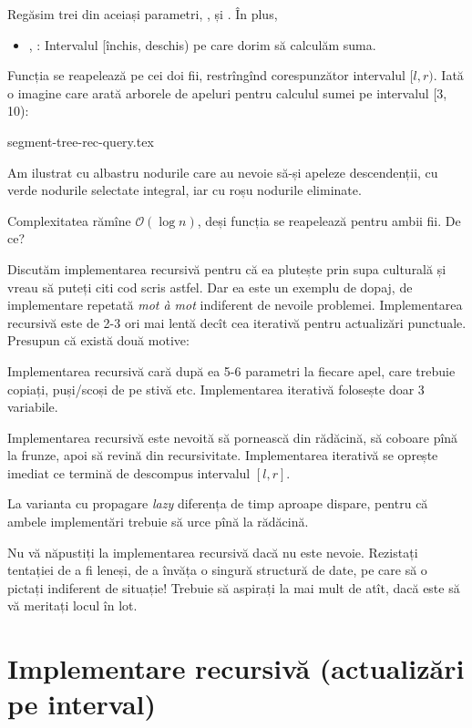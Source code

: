 Regăsim trei din aceiași parametri, ,  și . În plus,

\begin{itemize}
  \item {}, : Intervalul [închis, deschis) pe care dorim să calculăm suma.
\end{itemize}

Funcția se reapelează pe cei doi fii, restrîngînd corespunzător intervalul $[l, r)$. Iată o imagine care arată arborele de apeluri pentru calculul sumei pe intervalul [3, 10):

{segment-tree-rec-query.tex}

Am ilustrat cu albastru nodurile care au nevoie să-și apeleze descendenții, cu verde nodurile selectate integral, iar cu roșu nodurile eliminate.

Complexitatea rămîne $\mathcal{O}(\log n)$, deși funcția se reapelează pentru ambii fii. De ce?

Discutăm implementarea recursivă pentru că ea plutește prin supa culturală și vreau să puteți citi cod scris astfel. Dar ea este un exemplu de dopaj, de implementare repetată \textit{mot à mot} indiferent de nevoile problemei. Implementarea recursivă este de 2-3 ori mai lentă decît cea iterativă pentru actualizări punctuale. Presupun că există două motive:

Implementarea recursivă cară după ea 5-6 parametri la fiecare apel, care trebuie copiați, puși/scoși de pe stivă etc. Implementarea iterativă folosește doar 3 variabile.

Implementarea recursivă este nevoită să pornească din rădăcină, să coboare pînă la frunze, apoi să revină din recursivitate. Implementarea iterativă se oprește imediat ce termină de descompus intervalul $[l,r]$.

La varianta cu propagare \textit{lazy} diferența de timp aproape dispare, pentru că ambele implementări trebuie să urce pînă la rădăcină.

Nu vă năpustiți la implementarea recursivă dacă nu este nevoie. Rezistați tentației de a fi leneși, de a învăța o singură structură de date, pe care să o pictați indiferent de situație! Trebuie să aspirați la mai mult de atît, dacă este să vă meritați locul în lot.

\section{Implementare recursivă (actualizări pe interval)}

